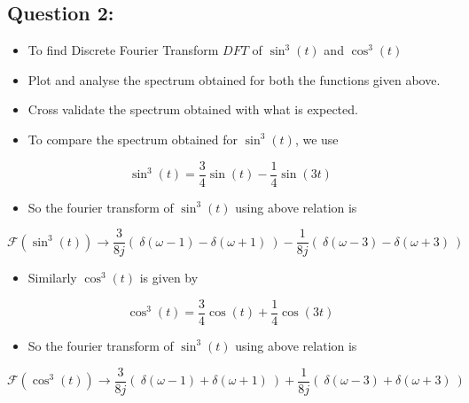 \documentclass[11pt, a4paper]{article}
\begin{document}
\subsection{Question 2:}\label{question-2}

\begin{itemize}

\item
  To find Discrete Fourier Transform \(DFT\) of \(\sin ^{3}(t)\) and
  \(\cos^{3}(t)\)
\item
  Plot and analyse the spectrum obtained for both the functions given
  above.
\item
  Cross validate the spectrum obtained with what is expected.
\item
  To compare the spectrum obtained for \(\sin^{3}(t)\), we use
\end{itemize}

\begin{equation}
\sin^{3}(t) = \frac{3}{4}\sin(t) - \frac{1}{4}\sin(3t)
\end{equation}

\begin{itemize}

\item
  So the fourier transform of \(\sin^{3}(t)\) using above relation is
\end{itemize}

\begin{equation}
\mathscr{F}({\sin^{3}(t)})  \to \frac{3}{8j}(\ \delta(\omega -1) - \delta(\omega+1) \ ) - \frac{1}{8j}(\ \delta(\omega -3) - \delta(\omega+3) \ )
\end{equation}

\begin{itemize}

\item
  Similarly \(\cos^{3}(t)\) is given by
\end{itemize}

\begin{equation}
\cos^{3}(t) = \frac{3}{4}\cos(t) + \frac{1}{4}\cos(3t)
\end{equation}

\begin{itemize}

\item
  So the fourier transform of \(\sin^{3}(t)\) using above relation is
\end{itemize}

\begin{equation}
\mathscr{F}({\cos^{3}(t)})  \to \frac{3}{8j}(\ \delta(\omega -1) + \delta(\omega+1) \ ) + \frac{1}{8j}(\ \delta(\omega -3) + \delta(\omega+3) \ )
\end{equation}
\end{document}
